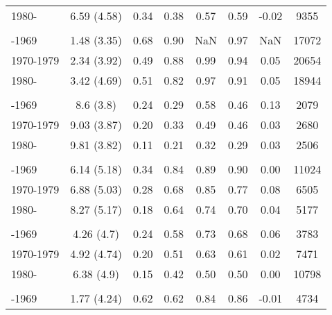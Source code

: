 \begin{ThreePartTable}
\begin{longtable}[t]{lccccccc}
\hspace{1em}1980- & 6.59 (4.58) & 0.34 & 0.38 & 0.57 & 0.59 & -0.02 & 9355\\
\addlinespace[0.3em]
\multicolumn{8}{l}{\textbf{Ethiopia}}\\
\hspace{1em}-1969 & 1.48 (3.35) & 0.68 & 0.90 & NaN & 0.97 & NaN & 17072\\
\hspace{1em}1970-1979 & 2.34 (3.92) & 0.49 & 0.88 & 0.99 & 0.94 & 0.05 & 20654\\
\hspace{1em}1980- & 3.42 (4.69) & 0.51 & 0.82 & 0.97 & 0.91 & 0.05 & 18944\\
\addlinespace[0.3em]
\multicolumn{8}{l}{\textbf{Gabon}}\\
\hspace{1em}-1969 & 8.6 (3.8) & 0.24 & 0.29 & 0.58 & 0.46 & 0.13 & 2079\\
\hspace{1em}1970-1979 & 9.03 (3.87) & 0.20 & 0.33 & 0.49 & 0.46 & 0.03 & 2680\\
\hspace{1em}1980- & 9.81 (3.82) & 0.11 & 0.21 & 0.32 & 0.29 & 0.03 & 2506\\
\addlinespace[0.3em]
\multicolumn{8}{l}{\textbf{Ghana}}\\
\hspace{1em}-1969 & 6.14 (5.18) & 0.34 & 0.84 & 0.89 & 0.90 & 0.00 & 11024\\
\hspace{1em}1970-1979 & 6.88 (5.03) & 0.28 & 0.68 & 0.85 & 0.77 & 0.08 & 6505\\
\hspace{1em}1980- & 8.27 (5.17) & 0.18 & 0.64 & 0.74 & 0.70 & 0.04 & 5177\\
\addlinespace[0.3em]
\multicolumn{8}{l}{\textbf{Guatemala}}\\
\hspace{1em}-1969 & 4.26 (4.7) & 0.24 & 0.58 & 0.73 & 0.68 & 0.06 & 3783\\
\hspace{1em}1970-1979 & 4.92 (4.74) & 0.20 & 0.51 & 0.63 & 0.61 & 0.02 & 7471\\
\hspace{1em}1980- & 6.38 (4.9) & 0.15 & 0.42 & 0.50 & 0.50 & 0.00 & 10798\\
\addlinespace[0.3em]
\multicolumn{8}{l}{\textbf{Guinea}}\\
\hspace{1em}-1969 & 1.77 (4.24) & 0.62 & 0.62 & 0.84 & 0.86 & -0.01 & 4734\\

\end{longtable}
\end{ThreePartTable}
